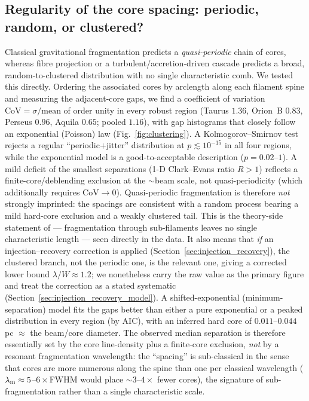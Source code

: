 \documentclass[usenatbib,twoside,twocolumn]{mnras}
\begin{document}
\subsection{Regularity of the core spacing: periodic, random, or clustered?}
\label{sec:clustering}
Classical gravitational fragmentation predicts a \emph{quasi-periodic} chain of cores, whereas fibre projection or a turbulent/accretion-driven cascade predicts a broad, random-to-clustered distribution with no single characteristic comb. We tested this directly. Ordering the associated cores by arclength along each filament spine and measuring the adjacent-core gaps, we find a coefficient of variation $\mathrm{CoV}=\sigma/\mathrm{mean}$ of order unity in every robust region (Taurus $1.36$, Orion~B $0.83$, Perseus $0.96$, Aquila $0.65$; pooled $1.16$), with gap histograms that closely follow an exponential (Poisson) law (Fig.~\ref{fig:clustering}). A Kolmogorov--Smirnov test rejects a regular ``periodic$+$jitter'' distribution at $p\lesssim10^{-15}$ in all four regions, while the exponential model is a good-to-acceptable description ($p=0.02$--$1$). A mild deficit of the smallest separations (1-D Clark--Evans ratio $R>1$) reflects a finite-core/deblending exclusion at the $\sim$beam scale, not quasi-periodicity (which additionally requires $\mathrm{CoV}\!\to\!0$). Quasi-periodic fragmentation is therefore \emph{not} strongly imprinted: the spacings are consistent with a random process bearing a mild hard-core exclusion and a weakly clustered tail. This is the theory-side statement of \citet{Clarke2020} --- fragmentation through sub-filaments leaves no single characteristic length --- seen directly in the data. It also means that \emph{if} an injection--recovery correction is applied (Section~\ref{sec:injection_recovery}), the clustered branch, not the periodic one, is the relevant one, giving a corrected lower bound $\lambda/W\approx1.2$; we nonetheless carry the raw value as the primary figure and treat the correction as a stated systematic (Section~\ref{sec:injection_recovery_model}). A shifted-exponential (minimum-separation) model fits the gaps better than either a pure exponential or a peaked distribution in every region (by AIC), with an inferred hard core of $0.011$--$0.044$\,pc $\approx$ the beam/core diameter. The observed median separation is therefore essentially set by the core line-density plus a finite-core exclusion, \emph{not} by a resonant fragmentation wavelength: the ``spacing'' is sub-classical in the sense that cores are more numerous along the spine than one per classical wavelength ($\lambda_{\rm m}\approx5$--$6\times$FWHM would place $\sim3$--$4\times$ fewer cores), the signature of sub-fragmentation rather than a single characteristic scale.
\end{document}
